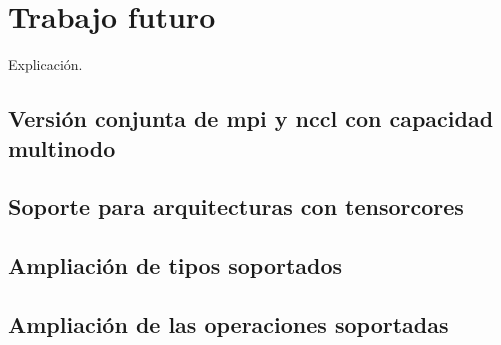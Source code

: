 
\chapter{Trabajo futuro\label{chapTrabajoFuturo}}

Explicación.


\section{Versión conjunta de mpi y nccl con capacidad multinodo}
\section{Soporte para arquitecturas con tensorcores}
\section{Ampliación de tipos soportados}
\section{Ampliación de las operaciones soportadas}


\newpage
